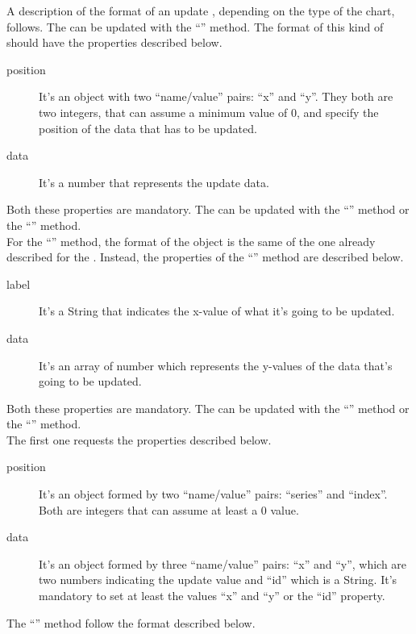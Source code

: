 	A description of the  format of an update , depending on the type of the chart, follows. 
		The  can be updated with the “” method. The format of this kind of  should have the properties described below.
		\begin{description}
			\item[position] It's an object with two “name/value” pairs: “x” and “y”. They both are two integers, that can assume a minimum value of 0, and specify the position of the data that has to be updated.
			\item[data] It's a number that represents the update data.
		\end{description}
		Both these properties are mandatory.
		The  can be updated with the “” method or the “” method. \\
		For the “” method, the format of the  object is the same of the one already described for the . Instead, the properties of the “” method are described below.
		\begin{description}
			\item[label] It's a String that indicates the x-value of what it's going to be updated.
			\item[data] It's an array of number which represents the y-values of the data that's going to be updated.
		\end{description}
		Both these properties are mandatory.
		The  can be updated with the “” method or the “” method. \\
		The first one requests the properties described below.
		\begin{description}
			\item[position] It's an object formed by two “name/value” pairs: “series” and “index”. Both are integers that can assume at least a 0 value.
			\item[data] It's an object formed by three “name/value” pairs: 
			“x” and “y”, which are two numbers indicating the update value and “id” which is a String. It's mandatory to set at least the values “x” and “y” or the “id” property.
		\end{description}
		The “” method follow the format described below.
